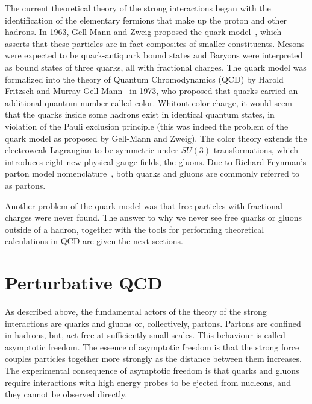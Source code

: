 The current theoretical theory of the strong interactions began with the identification of the elementary fermions that make up the proton and other hadrons. In 1963, Gell-Mann and Zweig proposed the quark model~\cite{GellMann1964214,Zweig:1964jf,Zweig2}, which asserts that these particles are in fact composites of smaller constituents.  Mesons were expected to be quark-antiquark bound states and Baryons were interpreted as bound states of three quarks, all with fractional charges. 
The quark model was formalized into the theory of Quantum Chromodynamics (QCD) by Harold Fritzsch and Murray Gell-Mann~\cite{Fritzsch1973365} in 1973, who proposed that quarks carried an additional quantum number called color.  Whitout color charge, it would seem that the quarks inside some hadrons exist in identical quantum states, in violation of the Pauli exclusion principle (this was indeed the problem of the quark model as proposed by Gell-Mann and Zweig). The color theory extends the electroweak Lagrangian to be symmetric under $SU(3)$ transformations, which introduces eight new physical gauge fields, the gluons. Due to
Richard Feynman's parton model nomenclature~\cite{PhysRevLett.23.1415}, both quarks and gluons are commonly referred to as partons.

Another problem of the quark model was that free particles with fractional charges were never found. The answer to why  we never see free quarks or gluons outside of a hadron, together with the tools for performing theoretical calculations in QCD are given the next sections.



\section{Perturbative QCD}\label{sec:qcd}


As described above, the fundamental actors of the theory of the strong interactions are quarks and gluons or, collectively, partons. Partons are confined in  %
hadrons, but, act free at sufficiently small scales. This behaviour is called asymptotic freedom. The essence of asymptotic freedom is that the strong force couples particles together more strongly as the distance between them increases. The experimental consequence of asymptotic freedom is that quarks and gluons require interactions with high energy probes to be ejected from nucleons, and they cannot be observed directly. 

